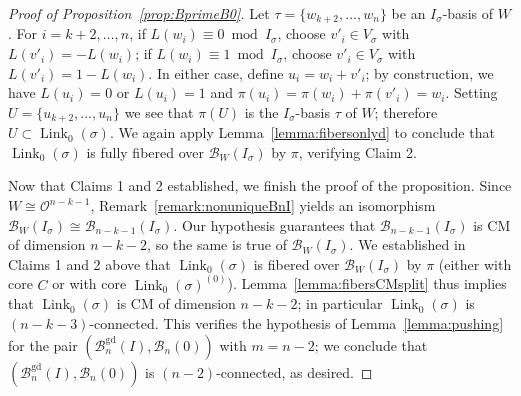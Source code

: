 \documentclass[11 pt]{article}
\theoremstyle{plain}
\theoremstyle{definition}
\numberwithin{equation}{section}
\renewcommand{\O}{\mathcal{O}}
\newcommand\PartialBases{\ensuremath{\mathcal{B}}}
\newcommand{\PB}{\PartialBases}
\newcommand{\PartialBasesGood}{\PartialBases^{\text{gd}}}
\newcommand{\PBg}{\PartialBasesGood}
\DeclareMathOperator{\Link}{Link}
\newcommand\iso{\cong}
\begin{document}
\begin{proof}[Proof of Proposition~\ref{prop:BprimeB0}]
Let  $\tau=\{w_{k+2},\ldots,w_n\}$ be an $I_\sigma$-basis of $W$. For $i=k+2,\ldots,n$, if $L(w_i)\equiv 0\bmod{I_\sigma}$, choose $v'_i\in V_\sigma$ with $L(v'_i)=-L(w_i)$; if $L(w_i)\equiv 1\bmod{I_\sigma}$, choose $v'_i\in V_\sigma$ with $L(v'_i)=1-L(w_i)$. In either case, define $u_i=w_i+v'_i$; by construction, we have $L(u_i)=0$ or $L(u_i)=1$ and  $\pi(u_i)=\pi(w_i)+\pi(v'_i)=w_i$. Setting $U=\{u_{k+2},\ldots,u_n\}$ we see that $\pi(U)$ is the $I_\sigma$-basis $\tau$ of $W$; therefore $U\subset \Link_0(\sigma)$. We again apply Lemma~\ref{lemma:fibersonlyd} to conclude that $\Link_0(\sigma)$ is fully fibered over $\PB_W(I_\sigma)$ by $\pi$, verifying Claim 2.

Now that Claims 1 and 2 established, we finish the proof of the proposition. Since $W\iso \O^{n-k-1}$,  Remark~\ref{remark:nonuniqueBnI} yields an isomorphism $\PB_W(I_\sigma)\iso \PB_{n-k-1}(I_\sigma)$. Our hypothesis guarantees that $\PB_{n-k-1}(I_\sigma)$ is CM of dimension $n-k-2$, so the same is true of $\PB_W(I_\sigma)$. We established in Claims 1 and 2 above that $\Link_0(\sigma)$ is fibered over $\PB_W(I_\sigma)$ by $\pi$ (either with core $C$ or with core $\Link_0(\sigma)^{(0)}$). Lemma~\ref{lemma:fibersCMsplit} thus implies that $\Link_0(\sigma)$ is CM of dimension $n-k-2$; in particular $\Link_0(\sigma)$ is $(n-k-3)$-connected. This verifies the hypothesis of Lemma~\ref{lemma:pushing} for the pair $(\PBg_n(I),\PB_n(0))$ with $m=n-2$; we conclude that $(\PBg_n(I),\PB_n(0))$ is $(n-2)$-connected, as desired.
\end{proof}
\end{document}
